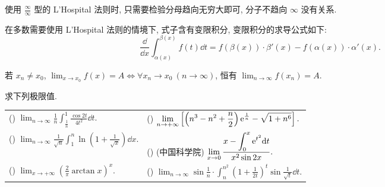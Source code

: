 使用 $\displaystyle\frac{\infty}{\infty}$ 型的 L'Hospital 法则时, 只需要检验分母趋向无穷大即可,
分子不趋向 $\infty$ 没有关系.

在多数需要使用 L'Hospital 法则的情境下, 式子含有变限积分, 变限积分的求导公式如下:
$$\frac{\dd }{\dd x}\int_{\alpha(x)}^{\beta(x)}f(t)\dd t=f(\beta(x))\cdot\beta'(x)-f(\alpha(x))\cdot\alpha'(x).$$

\begin{theorem}[Heine 定理]
    若 $x_n\not=x_0$, $\displaystyle\lim_{x\to x_0}f(x)=A\Leftrightarrow\forall x_n\to x_0~ (n\to\infty)$,
    恒有 $\displaystyle\lim_{n\to\infty}f(x_n)=A.$
\end{theorem}

\begin{example}
    求下列极限值.
    \setcounter{magicrownumbers}{0}
    \begin{table}[H]
        \centering
        \begin{tabular}{l | l}
            (\rownumber{}) $\displaystyle\lim_{n\to\infty}\frac{1}{n}\int_{\frac{1}{n}}^{1}\frac{\cos 2t}{4t^2}\dd t.$              & (\rownumber{}) $\displaystyle\lim_{n\to+\infty}\left[\left(n^3-n^2+\frac{n}{2}\right)\mathrm{e} ^{\frac{1}{n}}-\sqrt{1+n^6}\right].$               \\
            (\rownumber{}) $\displaystyle\lim_{n\to\infty}\frac{1}{\sqrt{n}}\int_{1}^{n}\ln\left(1+\frac{1}{\sqrt{x}}\right)\dd x.$ & (\rownumber{}) (中国科学院) $\displaystyle\lim_{x\to0}\frac{\displaystyle x-\int_{0}^{x}\mathrm{e} ^{t^2}\dd t}{x^2\sin2x}.$                       \\
            (\rownumber{}) $\displaystyle\lim_{x\to +\infty}\left(\frac{2}{\pi}\arctan x\right)^x.$                                 & (\rownumber{}) $\displaystyle\lim_{n\to\infty}\sin\frac{1}{n}\cdot\int_{n}^{n^2}\left(1+\frac{1}{2t}\right)^t\sin\frac{1}{\sqrt{t}}\dd t.$
        \end{tabular}
    \end{table}
\end{example}

